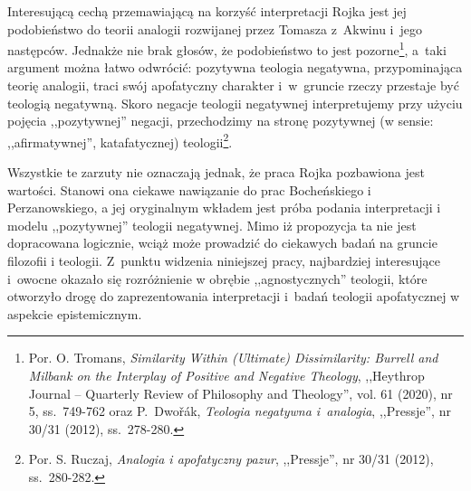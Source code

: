 Interesującą cechą przemawiającą na korzyść interpretacji Rojka jest jej podobieństwo
do teorii analogii rozwijanej przez Tomasza z~Akwinu i~jego następców. Jednakże nie brak
głosów, że podobieństwo to jest pozorne\footnote{Por.
O. Tromans, \textit{Similarity Within (Ultimate) Dissimilarity: Burrell and Milbank on the Interplay of Positive and Negative Theology}, ,,Heythrop Journal -- Quarterly Review of Philosophy and Theology'', vol. 61 (2020), nr 5, ss.~749-762
oraz
P.~Dwořák, \textit{Teologia negatywna i~analogia}, ,,Pressje'', nr 30/31 (2012),
ss.~278-280.},
a~taki argument można łatwo odwrócić: pozytywna teologia negatywna,
przypominająca teorię analogii, traci swój apofatyczny charakter i~w~gruncie rzeczy przestaje być teologią negatywną.
Skoro negacje teologii negatywnej interpretujemy przy
użyciu pojęcia ,,pozytywnej'' negacji, przechodzimy na stronę
pozytywnej (w sensie: ,,afirmatywnej'', katafatycznej) teologii\footnote{Por. S.
Ruczaj, \textit{Analogia i apofatyczny pazur}, ,,Pressje'', nr 30/31 (2012),
ss.~280-282.}.

Wszystkie te zarzuty nie oznaczają jednak, że praca Rojka pozbawiona jest
wartości. Stanowi ona ciekawe nawiązanie do prac Bocheńskiego i Perzanowskiego, a jej oryginalnym wkładem jest
próba podania interpretacji i modelu ,,pozytywnej'' teologii negatywnej. Mimo iż propozycja ta nie jest dopracowana logicznie, wciąż może prowadzić do ciekawych badań na gruncie filozofii i teologii. Z~punktu widzenia
niniejszej pracy, najbardziej interesujące i~owocne okazało się rozróżnienie w obrębie ,,agnostycznych'' teologii, które otworzyło drogę do zaprezentowania interpretacji i~badań teologii apofatycznej w aspekcie epistemicznym.


